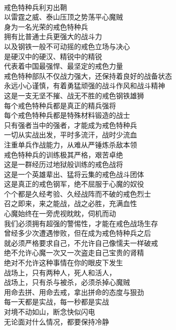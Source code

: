 \begin{adjustwidth}{-2em}{-2em}
    \begin{poem}[中国戒色力量]
        \begin{multicols}{2}
            \centering~\\
            戒色特种兵利刃出鞘 \\ 以雷霆之威、泰山压顶之势荡平心魔贼 \\ 身为一名光荣的戒色特种兵 \\ 拥有比普通士兵更强大的战斗力 \\ 以及钢铁一般不可动摇的戒色立场与决心 \\ 是硬汉中的硬汉、精锐中的精锐 \\ 代表着中国最强悍、最坚定的戒色力量 \\ 戒色特种部队不仅战力强大，还保持着良好的战备状态 \\ 永远小心谨慎，有着勇猛顽强的战斗作风和战斗精神 \\ 这是一支无坚不摧、战无不胜的戒色钢铁雄狮 \\ 每个戒色特种兵都是真正的精兵强将 \\ 每个戒色特种兵都是特殊材料锻造的战士 \\ 只有强者当中的强者，才能成为戒色特种兵 \\ 一切从实战出发，平时多流汗，战时少流血 \\ 注重单兵作战能力，从难从严锤炼杀敌本领 \\ 戒色特种兵的训练极其严格，艰苦卓绝 \\ 这是一群经历过地狱般训练的戒色战将 \\ 这是一个英雄辈出、猛将云集的戒色战斗团体 \\ 这是真正的戒色钢军，绝不屈服于心魔的奴役 \\ 个个都是久经考验、久经战阵而不破的戒色烈士 \\ 召之即来，来之能战，战之必胜，充满血性 \\ 心魔始终在一旁虎视眈眈，伺机而动 \\ 我们必须拥有超强的警惕性，才能在戒色战场生存 \\ 曾经多少次遭遇惨败，但在成为戒色特种兵之后 \\ 就必须严格要求自己，不允许自己像懦夫一样破戒 \\ 绝不允许心魔一次又一次盗走自己宝贵的肾精 \\ 绝对不允许这种事情在你的眼皮下发生 \\ 战场上，只有两种人，死人和活人， \\ 战场上，只有杀与被杀，必须杀掉心魔贼 \\ 用命去拼、用命去戒，拿出拼命的态度与狠劲 \\ 每一天都是实战，每一秒都是实战 \\ 对境不动如山，断念快似闪电 \\ 无论面对什么情况，都要保持冷静 \\ 
\end{multicols}
\end{poem}
\end{adjustwidth}
